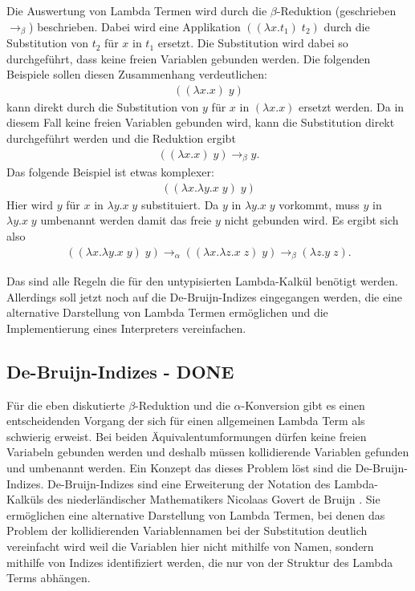 \documentclass[ngerman]{article}
\begin{document}
Die Auswertung von Lambda Termen wird durch die $\beta$-Reduktion (geschrieben $\rightarrow_\beta$) beschrieben.
Dabei wird eine Applikation $((\lambda x.t_1) \; t_2)$ durch die Substitution von $t_2$ für $x$ in $t_1$ ersetzt. Die Substitution wird dabei so durchgeführt, dass keine freien Variablen gebunden werden. Die folgenden Beispiele sollen diesen Zusammenhang verdeutlichen:
\begin{align*}
    ((\lambda x.x) \; y)
\end{align*}
kann direkt durch die Substitution von $y$ für $x$ in $(\lambda x.x)$ ersetzt werden. Da in diesem Fall keine freien Variablen gebunden wird, kann die Substitution direkt durchgeführt werden und die Reduktion ergibt
\begin{align*}
    ((\lambda x.x) \; y) \rightarrow_\beta y.
\end{align*}
Das folgende Beispiel ist etwas komplexer:
\begin{align*}
    ((\lambda x.\lambda y.x \; y) \; y)
\end{align*}
Hier wird $y$ für $x$ in $\lambda y.x \; y$ substituiert. Da $y$ in $\lambda y.x \; y$ vorkommt, muss $y$ in $\lambda y.x \; y$ umbenannt werden damit das freie $y$ nicht gebunden wird. Es ergibt sich also
\begin{align*}
    ((\lambda x.\lambda y.x \; y) \; y) \rightarrow_\alpha ((\lambda x.\lambda z.x \; z) \; y) \rightarrow_\beta (\lambda z.y \; z).
\end{align*}


Das sind alle Regeln die für den untypisierten Lambda-Kalkül benötigt werden.
Allerdings soll jetzt noch auf die De-Bruijn-Indizes eingegangen werden, die eine alternative Darstellung von Lambda Termen ermöglichen und die Implementierung eines Interpreters vereinfachen.

\subsection{De-Bruijn-Indizes - DONE}

Für die eben diskutierte $\beta$-Reduktion und die $\alpha$-Konversion gibt es einen entscheidenden Vorgang der sich für einen allgemeinen Lambda Term als schwierig erweist.
Bei beiden Äquivalentumformungen dürfen keine freien Variabeln gebunden werden und deshalb müssen kollidierende Variablen gefunden und umbenannt werden.
Ein Konzept das dieses Problem löst sind die De-Bruijn-Indizes.
De-Bruijn-Indizes sind eine Erweiterung der Notation des Lambda-Kalküls des niederländischer Mathematikers Nicolaas Govert de Bruijn \cite*{DEBRUIJN1972381}. Sie ermöglichen eine alternative Darstellung von Lambda Termen, bei denen das Problem der kollidierenden Variablennamen bei der Substitution deutlich vereinfacht wird weil die Variablen hier nicht mithilfe von Namen, sondern mithilfe von Indizes identifiziert werden, die nur von der Struktur des Lambda Terms abhängen.
\end{document}
